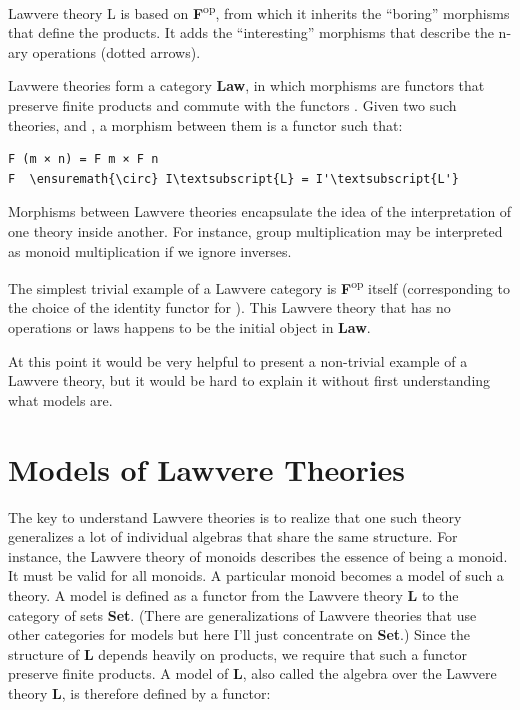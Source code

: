 \noindent
Lawvere theory L is based on \textbf{F}\textsuperscript{op}, from which
it inherits the ``boring'' morphisms that define the products. It adds
the ``interesting'' morphisms that describe the n-ary operations (dotted
arrows).

Lavwere theories form a category \textbf{Law}, in which morphisms are
functors that preserve finite products and commute with the functors
. Given two such theories,  and
, a morphism between them is a
functor  such that:

\begin{Verbatim}[commandchars=\\\{\}]
F (m × n) = F m × F n
F  \ensuremath{\circ} I\textsubscript{L} = I'\textsubscript{L'}
\end{Verbatim}
Morphisms between Lawvere theories encapsulate the idea of the
interpretation of one theory inside another. For instance, group
multiplication may be interpreted as monoid multiplication if we ignore
inverses.

The simplest trivial example of a Lawvere category is
\textbf{F}\textsuperscript{op} itself (corresponding to the choice of
the identity functor for ). This Lawvere theory that has no
operations or laws happens to be the initial object in \textbf{Law}.

At this point it would be very helpful to present a non-trivial example
of a Lawvere theory, but it would be hard to explain it without first
understanding what models are.

\section{Models of Lawvere Theories}\label{models-of-lawvere-theories}

The key to understand Lawvere theories is to realize that one such
theory generalizes a lot of individual algebras that share the same
structure. For instance, the Lawvere theory of monoids describes the
essence of being a monoid. It must be valid for all monoids. A
particular monoid becomes a model of such a theory. A model is defined
as a functor from the Lawvere theory \textbf{L} to the category of sets
\textbf{Set}. (There are generalizations of Lawvere theories that use
other categories for models but here I'll just concentrate on
\textbf{Set}.) Since the structure of \textbf{L} depends heavily on
products, we require that such a functor preserve finite products. A
model of \textbf{L}, also called the algebra over the Lawvere theory
\textbf{L}, is therefore defined by a functor:

